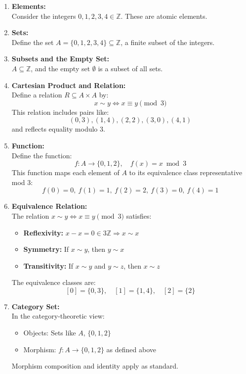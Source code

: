 \documentclass[10pt]{article}
\theoremstyle{plain}
\theoremstyle{definition}
\begin{document}
  \begin{enumerate}
  	\item \textbf{Elements:} \\
  	Consider the integers \( 0, 1, 2, 3, 4 \in \mathbb{Z} \). These are atomic elements.
  	
  	\item \textbf{Sets:} \\
  	Define the set \( A = \{0, 1, 2, 3, 4\} \subseteq \mathbb{Z} \), a finite subset of the integers.
  	
  	\item \textbf{Subsets and the Empty Set:} \\
  	\( A \subseteq \mathbb{Z} \), and the empty set \( \emptyset \) is a subset of all sets.
  	
  	\item \textbf{Cartesian Product and Relation:} \\
  	Define a relation \( R \subseteq A \times A \) by:
  	\[
  	x \sim y \iff x \equiv y \pmod{3}
  	\]
  	This relation includes pairs like:
  	\[
  	(0, 3), (1, 4), (2, 2), (3, 0), (4, 1)
  	\]
  	and reflects equality modulo 3.
  	
  	\item \textbf{Function:} \\
  	Define the function:
  	\[
  	f : A \to \{0, 1, 2\}, \quad f(x) = x \bmod 3
  	\]
  	This function maps each element of \( A \) to its equivalence class representative mod 3:
  	\[
  	f(0) = 0,\ f(1) = 1,\ f(2) = 2,\ f(3) = 0,\ f(4) = 1
  	\]
  	
  	\item \textbf{Equivalence Relation:} \\
  	The relation \( x \sim y \iff x \equiv y \pmod{3} \) satisfies:
  	\begin{itemize}
  		\item \textbf{Reflexivity:} \( x - x = 0 \in 3\mathbb{Z} \Rightarrow x \sim x \)
  		\item \textbf{Symmetry:} If \( x \sim y \), then \( y \sim x \)
  		\item \textbf{Transitivity:} If \( x \sim y \) and \( y \sim z \), then \( x \sim z \)
  	\end{itemize}
  	The equivalence classes are:
  	\[
  	[0] = \{0, 3\}, \quad [1] = \{1, 4\}, \quad [2] = \{2\}
  	\]
  	
  	\item \textbf{Category \textbf{Set}:} \\
  	In the category-theoretic view:
  	\begin{itemize}
  		\item Objects: Sets like \( A \), \( \{0,1,2\} \)
  		\item Morphism: \( f : A \to \{0,1,2\} \) as defined above
  	\end{itemize}
  	Morphism composition and identity apply as standard.
  	

\end{enumerate}
\end{document}
